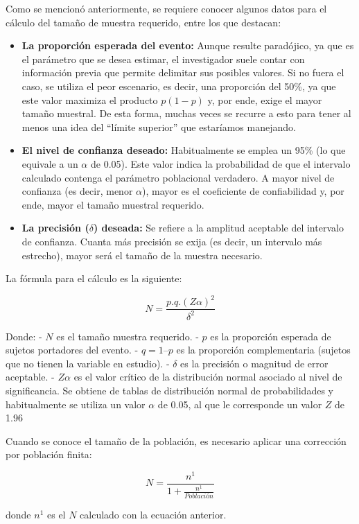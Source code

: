\documentclass[
  spanish,
  a4paper,
]{scrbook}
\begin{document}
Como se mencionó anteriormente, se requiere conocer algunos datos para
el cálculo del tamaño de muestra requerido, entre los que destacan:

\begin{itemize}
\item
  \textbf{La proporción esperada del evento:} Aunque resulte paradójico,
  ya que es el parámetro que se desea estimar, el investigador suele
  contar con información previa que permite delimitar sus posibles
  valores. Si no fuera el caso, se utiliza el peor escenario, es decir,
  una proporción del 50\%, ya que este valor maximiza el producto
  \(p(1-p)\) y, por ende, exige el mayor tamaño muestral. De esta forma,
  muchas veces se recurre a esto para tener al menos una idea del
  ``límite superior'' que estaríamos manejando.
\item
  \textbf{El nivel de confianza deseado:} Habitualmente se emplea un
  95\% (lo que equivale a un \(\alpha\) de 0.05). Este valor indica la
  probabilidad de que el intervalo calculado contenga el parámetro
  poblacional verdadero. A mayor nivel de confianza (es decir, menor
  \(\alpha\)), mayor es el coeficiente de confiabilidad y, por ende,
  mayor el tamaño muestral requerido.
\item
  \textbf{La precisión (}\(\delta\)\textbf{) deseada:} Se refiere a la
  amplitud aceptable del intervalo de confianza. Cuanta más precisión se
  exija (es decir, un intervalo más estrecho), mayor será el tamaño de
  la muestra necesario.
\end{itemize}

La fórmula para el cálculo es la siguiente:

\[
N = \frac{p.q.(Z\alpha)^2}{\delta^2}
\]

Donde: - \(N\) es el tamaño muestra requerido. - \(p\) es la proporción
esperada de sujetos portadores del evento. - \(q = 1 – p\) es la
proporción complementaria (sujetos que no tienen la variable en
estudio). - \(\delta\) es la precisión o magnitud de error aceptable. -
\(Z\alpha\) es el valor crítico de la distribución normal asociado al
nivel de significancia. Se obtiene de tablas de distribución normal de
probabilidades y habitualmente se utiliza un valor \(\alpha\) de 0.05,
al que le corresponde un valor \(Z\) de 1.96

Cuando se conoce el tamaño de la población, es necesario aplicar una
corrección por población finita:

\[
N =\frac{n^1}{1+\frac{n^1}{Población}}
\]

donde \(n^1\) es el \(N\) calculado con la ecuación anterior.
\end{document}
